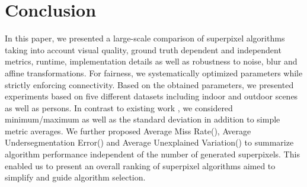 \documentclass[5p]{elsarticle}
\def\AvgRec{Average\allowbreak\xspace Miss Rate\xspace}
\def\AvgUE{Average\allowbreak\xspace Undersegmentation\allowbreak\xspace Error\xspace}
\def\AvgEV{Average\allowbreak\xspace Unexplained\allowbreak\xspace Variation\xspace}
\def\AUE{\text{AUE}\xspace}
\def\ARec{\text{AMR}\xspace}
\def\AEV{\text{AUV}\xspace}
\begin{document}









\section{Conclusion}
\label{sec:conclusion}

In this paper, we presented a large-scale comparison of superpixel algorithms
taking into account visual quality, ground truth dependent and independent metrics,
runtime, implementation details as well as robustness to noise, blur and affine transformations.
For fairness, we systematically optimized parameters while strictly
enforcing connectivity. Based on the obtained parameters, we presented experiments
based on five different datasets including indoor and outdoor scenes as well as persons.
In contrast to existing work \cite{SchickFischerStiefelhagen:2012,AchantaShajiSmithLucchiFuaSuesstrunk:2012,NeubertProtzel:2012,NeubertProtzel:2013},
we considered minimum/maximum as well as the standard deviation in addition to simple metric averages.
We further proposed \AvgRec (\ARec), \AvgUE (\AUE) and \AvgEV (\AEV) to summarize algorithm performance
independent of the number of generated superpixels.
This enabled us to present an overall ranking of superpixel algorithms aimed to simplify and guide algorithm selection.
\end{document}
